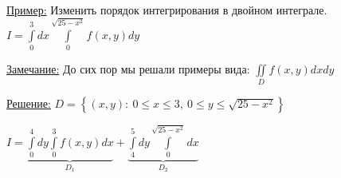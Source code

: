 
\underline{Пример:} Изменить порядок интегрирования в двойном интеграле.
$I = \int\limits_{0}^{3} dx \int\limits_{0}^{\sqrt{25-x^2}} f(x,y)dy$

\underline{Замечание:} До сих пор мы решали примеры вида: $\iint\limits_{D} f(x,y)dxdy$

\underline{Решение:} 
$D = \left\{ (x,y): \ 0 \leqslant x \leqslant 3, \ 0 \leqslant y \leqslant \sqrt{25 - x^2} \right\}$

$I = \underbrace{\int\limits_{0}^{4} dy \int\limits_{0}^{3} f(x,y) dx}_{D_1} + \underbrace{\int\limits_{4}^{5} dy \int\limits_{0}^{\sqrt{25 - x^2}} dx}_{D_2}$





































